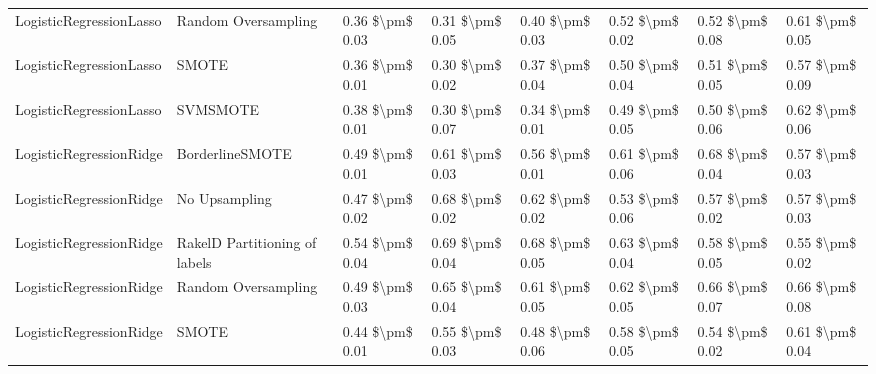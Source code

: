 \begin{tabular}{llllllll}
        LogisticRegressionLasso &           Random Oversampling &     0.36 \$\textbackslash pm\$ 0.03 &           0.31 \$\textbackslash pm\$ 0.05 &       0.40 \$\textbackslash pm\$ 0.03 &        0.52 \$\textbackslash pm\$ 0.02 &                         0.52 \$\textbackslash pm\$ 0.08 & 0.61 \$\textbackslash pm\$ 0.05 \\
        LogisticRegressionLasso &                         SMOTE &     0.36 \$\textbackslash pm\$ 0.01 &           0.30 \$\textbackslash pm\$ 0.02 &       0.37 \$\textbackslash pm\$ 0.04 &        0.50 \$\textbackslash pm\$ 0.04 &                         0.51 \$\textbackslash pm\$ 0.05 & 0.57 \$\textbackslash pm\$ 0.09 \\
        LogisticRegressionLasso &                      SVMSMOTE &     0.38 \$\textbackslash pm\$ 0.01 &           0.30 \$\textbackslash pm\$ 0.07 &       0.34 \$\textbackslash pm\$ 0.01 &        0.49 \$\textbackslash pm\$ 0.05 &                         0.50 \$\textbackslash pm\$ 0.06 & 0.62 \$\textbackslash pm\$ 0.06 \\
        LogisticRegressionRidge &               BorderlineSMOTE &     0.49 \$\textbackslash pm\$ 0.01 &           0.61 \$\textbackslash pm\$ 0.03 &       0.56 \$\textbackslash pm\$ 0.01 &        0.61 \$\textbackslash pm\$ 0.06 &                         0.68 \$\textbackslash pm\$ 0.04 & 0.57 \$\textbackslash pm\$ 0.03 \\
        LogisticRegressionRidge &                 No Upsampling &     0.47 \$\textbackslash pm\$ 0.02 &           0.68 \$\textbackslash pm\$ 0.02 &       0.62 \$\textbackslash pm\$ 0.02 &        0.53 \$\textbackslash pm\$ 0.06 &                         0.57 \$\textbackslash pm\$ 0.02 & 0.57 \$\textbackslash pm\$ 0.03 \\
        LogisticRegressionRidge & RakelD Partitioning of labels &     0.54 \$\textbackslash pm\$ 0.04 &           0.69 \$\textbackslash pm\$ 0.04 &       0.68 \$\textbackslash pm\$ 0.05 &        0.63 \$\textbackslash pm\$ 0.04 &                         0.58 \$\textbackslash pm\$ 0.05 & 0.55 \$\textbackslash pm\$ 0.02 \\
        LogisticRegressionRidge &           Random Oversampling &     0.49 \$\textbackslash pm\$ 0.03 &           0.65 \$\textbackslash pm\$ 0.04 &       0.61 \$\textbackslash pm\$ 0.05 &        0.62 \$\textbackslash pm\$ 0.05 &                         0.66 \$\textbackslash pm\$ 0.07 & 0.66 \$\textbackslash pm\$ 0.08 \\
        LogisticRegressionRidge &                         SMOTE &     0.44 \$\textbackslash pm\$ 0.01 &           0.55 \$\textbackslash pm\$ 0.03 &       0.48 \$\textbackslash pm\$ 0.06 &        0.58 \$\textbackslash pm\$ 0.05 &                         0.54 \$\textbackslash pm\$ 0.02 & 0.61 \$\textbackslash pm\$ 0.04 \\

\end{tabular}
